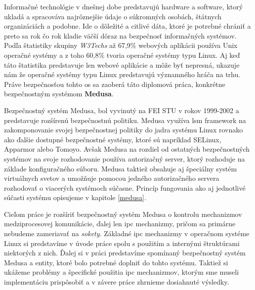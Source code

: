 Informačné technológie v dnešnej dobe predstavujú hardware a software, ktorý ukladá a spracováva najrôznejšie údaje o súkromných osobách, štátnych organizáciách a podobne. Ide o dôležité a citlivé dáta, ktoré je potrebné chrániť a preto sa rok čo rok kladie väčší dôraz na bezpečnosť informačných systémov. Podľa štatistiky skupiny \textit{W3Techs} až 67,9\% webových aplikácii používa Unix operačné systémy a z toho 60,8\% tvoria operačné systémy typu Linux.\cite{stats} Aj keď táto štatistika predstavuje len webové aplikácie a môže byť nepresná, ukazuje nám že operačné systémy typu Linux predstavujú významného hráča na trhu. Práve bezpečnosťou tohto \acrshort{os} sa zaoberá táto diplomová práca, konkrétne bezpečnostným systémom \textbf{Medusa}.

Bezpečnostný systém Medusa, bol vyvinutý na FEI STU v rokov 1999-2002 a predstavuje rozšírenú bezpečnostnú politiku. Medusa využíva \acrshort{lsm} framework na zakomponovanie svojej bezpečnostnej politiky do jadra systému Linux rovnako ako ďalšie dostupné bezpečnostné systémy, ktoré sú napríklad SELinux, Apparmor alebo Tomoyo. Avšak Medusa na rozdiel od ostatných bezpečnostných systémov na svoje rozhodovanie používa autorizačný server, ktorý rozhoduje na základe konfiguračného súboru. Medusa taktiež obsahuje aj špeciálny systém virtuálnych svetov a umožňuje pomocou jedného autorizačného servera rozhodovať o viacerých systémoch súčasne. Princíp fungovania ako aj jednotlivé súčasti systému opisujeme v kapitole \ref{medusa}.

Cieľom práce je rozšíriť bezpečnostný systém Medusa o kontrolu mechanizmov medziprocesovej komunikácie, ďalej len \acrshort{ipc} mechanizmy, pričom sa primárne nebudeme zameriavať na \textit{sokety}. Základné \acrshort{ipc} mechanizmy v operačnom systéme Linux si predstavíme v úvode práce spolu s použitím a internými štruktúrami niektorých z nich. Ďalej si v práci predstavíme spomínaný bezpečnostný systém Medusa a entity, ktoré bolo potrebné doplniť do tohto systému. Taktiež si ukážeme problémy a špecifické použitia \acrshort{ipc} mechanizmov, ktorým sme museli implementáciu prispôsobiť a v závere práce zhrnieme dosiahnuté výsledky. 